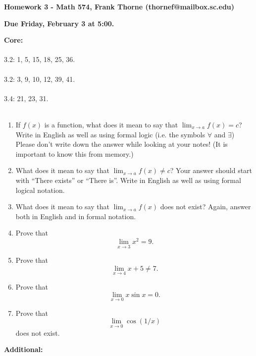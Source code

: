 \documentclass[12pt]{article}
\begin{document}
\setlength{\topmargin}{-2mm}





\begin{center}{\bf Homework 3 - Math 574, Frank Thorne (thornef@mailbox.sc.edu)}
\end{center}
\begin{center}
{\bf Due Friday, February 3 at 5:00.}
\end{center}
{\bf Core:}
\\
\\
3.2: 1, 5, 15, 18, 25, 36.
\\
\\
3.2: 3, 9, 10, 12, 39, 41.
\\
\\
3.4: 21, 23, 31.
\\
\\
\begin{enumerate}
\item
If $f(x)$ is a function, what does it mean to say that $\lim_{x \rightarrow a} f(x) = c$?
Write in English as well as using formal logic (i.e. the symbols $\forall$ and $\exists$)
Please don't write down the answer while looking at your notes! (It is important to know this from memory.)

\item
What does it mean to say that $\lim_{x \rightarrow a} f(x) \neq c$? Your answer should start
with ``There exists'' or ``There is''. Write in English as well as using formal logical notation.

\item
What does it mean to say that $\lim_{x \rightarrow a} f(x)$ does not exist? Again, answer both in English
and in formal notation.

\item
Prove that
$$\lim_{x \rightarrow 3} x^2 = 9.$$

\item
Prove that
$$\lim_{x \rightarrow 4} x + 5 \neq 7.$$

\item
Prove that
$$\lim_{x \rightarrow 0} x \sin x = 0.$$

\item
Prove that
$$\lim_{x \rightarrow 0} \cos(1/x)$$ does not exist.
\end{enumerate}
{\bf Additional:}
\\
\\
\end{document}
